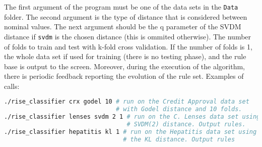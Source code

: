 \documentclass[a4paper]{article}
\begin{document}
The first argument of the program must be one of the data sets in the \texttt{Data} folder. The second argument is the type of distance that is considered between nominal values. The next argument should be the q parameter of the SVDM distance if \texttt{svdm} is the chosen distance (this is ommited otherwise). The number of folds to train and test with k-fold cross validation. If the number of folds is 1, the whole data set if used for training (there is no testing phase), and the rule base is output to the screen. Moreover, during the execution of the algorithm, there is periodic feedback reporting the evolution of the rule set. Examples of calls:
\begin{lstlisting}[language=bash,frame=single]
./rise_classifier crx godel 10 # run on the Credit Approval data set
                               # with Godel distance and 10 folds.
./rise_classifier lenses svdm 2 1 # run on the C. Lenses data set using
                                  # SVDM(2) distance. Output rules.
./rise_classifier hepatitis kl 1 # run on the Hepatitis data set using
                                 # the KL distance. Output rules
\end{lstlisting}



\end{document}
